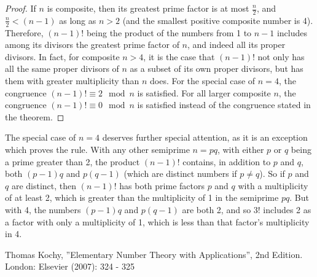 \documentclass[12pt]{article}
\begin{document}
\begin{cnl}
\begin{demark}
\begin{proof}
If $n$ is composite, then its greatest prime factor is at most $\displaystyle \frac{n}{2}$, and $\displaystyle \frac{n}{2} < (n - 1)$ as long as $n > 2$ (and the smallest positive composite number is 4). Therefore, $(n - 1)!$ being the product of the numbers from 1 to $n - 1$ includes among its divisors the greatest prime factor of $n$, and indeed all its proper divisors. In fact, for composite $n > 4$, it is the case that $(n - 1)!$ not only has all the same proper divisors of $n$ as a subset of its own proper divisors, but has them with greater multiplicity than $n$ does. For the special case of $n = 4$, the congruence $(n - 1)! \equiv 2 \mod n$ is satisfied. For all larger composite $n$, the congruence $(n - 1)! \equiv 0 \mod n$ is satisfied instead of the congruence stated in the theorem.
\end{proof}

The special case of $n = 4$ deserves further special attention, as it is an exception which proves the rule. With any other semiprime $n = pq$, with either $p$ or $q$ being a prime greater than 2, the product $(n - 1)!$ contains, in addition to $p$ and $q$, both $(p - 1)q$ and $p(q - 1)$ (which are distinct numbers if $p \neq q$). So if $p$ and $q$ are distinct, then $(n - 1)!$ has both prime factors $p$ and $q$ with a multiplicity of at least 2, which is greater than the multiplicity of 1 in the semiprime $pq$. But with 4, the numbers $(p - 1)q$ and $p(q - 1)$ are both 2, and so 3! includes 2 as a factor with only a multiplicity of 1, which is less than that factor's multiplicity in 4.
\end{demark}

\begin{thebibliography}{1}
 Thomas Kochy, ''Elementary Number Theory with Applications'', 2nd Edition. London: Elsevier (2007): 324 - 325
\end{thebibliography}




\end{cnl}
\end{document}
